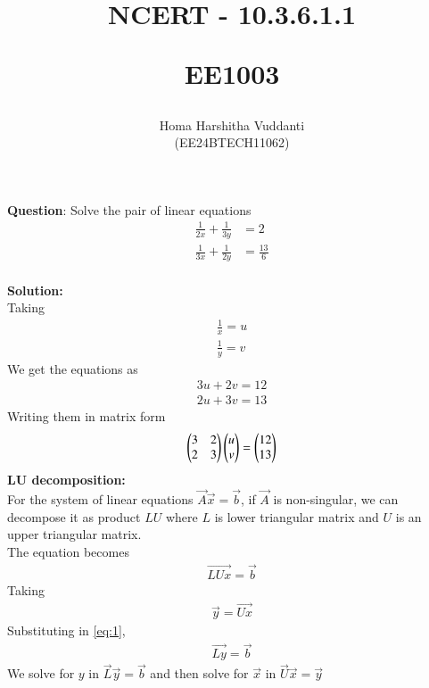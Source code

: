 \documentclass[journal]{IEEEtran}
\begin{document}


\title{
NCERT - 10.3.6.1.1

\large{EE1003}
}
\author{Homa Harshitha Vuddanti

(EE24BTECH11062)
}	

\maketitle

\bigskip

\renewcommand{\thefigure}{\theenumi}
\renewcommand{\thetable}{\theenumi}
\textbf{Question}: Solve the pair of linear equations
\begin{align}
    \frac{1}{2x}+\frac{1}{3y}&=2\\
    \frac{1}{3x}+\frac{1}{2y}&=\frac{13}{6}
\end{align}\\
\textbf{Solution: }\\
Taking
\begin{align}
    \frac{1}{x}=u\\
    \frac{1}{y}=v
\end{align}
We get the equations as
\begin{align}
    3u+2v=12\\
    2u+3v=13
\end{align}
Writing them in matrix form
\begin{align}
\begin{pmatrix}3 & 2 \\2 & 3\end{pmatrix}
\begin{pmatrix}u\\v\end{pmatrix}=\begin{pmatrix}12 \\ 13\end{pmatrix}
\end{align}
\textbf{LU decomposition:}\\
For the system of linear equations $\vec{A}\vec{x}=\vec{b}$, if $\vec{A}$ is non-singular, we can decompose it as product $LU$ where $L$ is lower triangular matrix and $U$ is an upper triangular matrix.\\
The equation becomes 
\begin{align}
    \vec{LUx}=\vec{b} \label{eq:1}
\end{align}
Taking 
\begin{align}
    \vec{y}=\vec{Ux}
\end{align}
Substituting in \eqref{eq:1},
\begin{align}
    \vec{Ly}=\vec{b}
\end{align}
We solve for $y$ in $\vec{L}\vec{y}=\vec{b}$ and then solve for $\vec{x}$ in $\vec{U}\vec{x}=\vec{y}$\\
\end{document}
